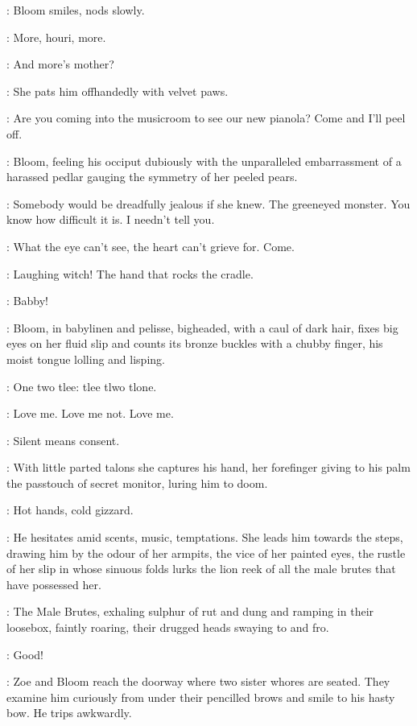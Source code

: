 :
Bloom smiles,
nods slowly.

\Bloom:
More,
houri,
more.

\Zoe:
And more's mother?

:
She pats him offhandedly with velvet paws.

\Zoe:
Are you coming into the musicroom to see our new pianola?
Come and I'll peel off.

:
Bloom,
feeling his occiput dubiously with the unparalleled embarrassment
of a harassed pedlar gauging the symmetry of her peeled pears.

\Bloom:
Somebody would be dreadfully jealous if she knew.
The greeneyed monster.
You know how difficult it is.
I needn't tell you.

\Zoe:
What the eye can't see,
the heart can't grieve for.
Come.

\Bloom:
Laughing witch!
The hand that rocks the cradle.

\Zoe:
Babby!

:
Bloom,
in babylinen and pelisse,
bigheaded,
with a caul of dark hair,
fixes big eyes on her fluid slip
and counts its bronze buckles with a chubby finger,
his moist tongue lolling and lisping.

\Bloom:
One two tlee:
tlee tlwo tlone.

\Buckles[2]:
Love me.
Love me not.
Love me.

\Zoe:
Silent means consent.

:
With little parted talons she captures his hand,
her forefinger giving to his palm the passtouch of secret monitor,
luring him to doom.

\Zoe:
Hot hands,
cold gizzard.

:
He hesitates amid scents,
music,
temptations.
She leads him towards the steps,
drawing him by the odour of her armpits,
the vice of her painted eyes,
the rustle of her slip in whose sinuous folds
lurks the lion reek of all the male brutes that have possessed her.

:
The Male Brutes,
exhaling sulphur of rut and dung
and ramping in their loosebox,
faintly roaring,
their drugged heads swaying to and fro.

\MaleBrutes:
Good!

:
Zoe and Bloom reach the doorway where two sister whores are seated.
They examine him curiously from under their pencilled brows and smile to his hasty bow.
He trips awkwardly.

